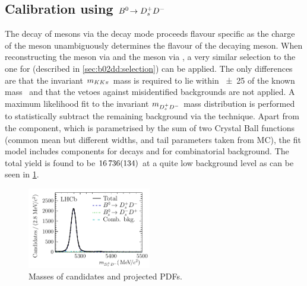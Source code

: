 
\subsection[Calibration using \texorpdfstring{$\BdToDsD$}{Bd2DsD}]{Calibration using \texorpdfstring{$\BdToDsD$}{Bd2DsD}}
\label{sec:dataanalysis:taggingcalibration:dsdcalibration}

The decay of \Bd mesons via the decay mode \BdToDsD proceeds flavour specific
as the charge of the \Dsp meson unambiguously determines the flavour of the
decaying \Bd meson. When reconstructing the \Dsp meson via \DspToKKpi and the
\Dp meson via \DpToKpipi, a very similar selection to the one for \BdToDD
(described in \cref{sec:b02dd:selection}) can be applied. The only differences
are that the invariant $m_{KK\pi}$ mass is required to lie within
\SI{\pm25}{\MeVcc} of the known \Dsp mass~\cite{PDG2014} and that the vetoes
against misidentified backgrounds are not applied. A maximum likelihood fit to
the invariant $m_{{{D}^+_{s}}{{D}^-}}$ mass distribution is performed to statistically
subtract the remaining background via the \sPlot technique. Apart from the
\BdToDsD component, which is parametrised by the sum of two Crystal Ball
functions (common mean but different widths, and tail parameters taken from
MC), the fit model includes components for \BsToDsD decays and for
combinatorial background. The total \BdToDsD yield is found to be
$\num{16736\pm134}$ at a quite low background level as can be seen in
\cref{fig:dataanalysis:taggingcalibration:dsdcalibration:mass}.

\begin{figure}[htb]
\centering
\includegraphics[width=0.48\textwidth]{05-DataAnalysis/tikz/pdf/DsD_MassFit.pdf}
\caption{Masses of \BdToDsD candidates and projected PDFs.}
\label{fig:dataanalysis:taggingcalibration:dsdcalibration:mass}
\end{figure}

